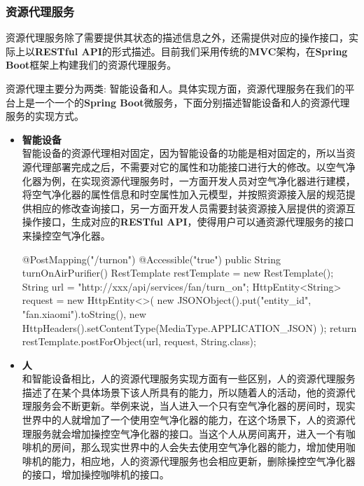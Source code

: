 \documentclass[a4paper, 12pt]{article}
\theoremstyle{definition}
\begin{document}
\subsubsection{资源代理服务}

资源代理服务除了需要提供其状态的描述信息之外，还需提供对应的操作接口，实际上以\textbf{RESTful API}的形式描述。目前我们采用传统的\textbf{MVC}架构，在\textbf{Spring Boot}框架上构建我们的资源代理服务。

资源代理主要分为两类: 智能设备和人。具体实现方面，资源代理服务在我们的平台上是一个一个的\textbf{Spring Boot}微服务，下面分别描述智能设备和人的资源代理服务的实现方式。

\begin{itemize}
	\item{\textbf{智能设备}}\\
	智能设备的资源代理相对固定，因为智能设备的功能是相对固定的，所以当资源代理部署完成之后，不需要对它的属性和功能接口进行大的修改。以空气净化器为例，在实现资源代理服务时，一方面开发人员对空气净化器进行建模，将空气净化器的属性信息和时空属性加入元模型，并按照资源接入层的规范提供相应的修改查询接口，另一方面开发人员需要封装资源接入层提供的资源互操作接口，生成对应的\textbf{RESTful API}，使得用户可以通资源代理服务的接口来操控空气净化器。
\begin{scala}
    @PostMapping("/turnon")
    @Accessible("true")
    public String turnOnAirPurifier(){
        RestTemplate restTemplate = new RestTemplate();
        String url = "http://xxx/api/services/fan/turn_on";
        HttpEntity<String> request = new HttpEntity<>(
            new JSONObject().put("entity_id", "fan.xiaomi").toString(), 
            new HttpHeaders().setContentType(MediaType.APPLICATION_JSON)
        );
        return restTemplate.postForObject(url, request, String.class);
    }
\end{scala}
    \item{\textbf{人}}\\
    和智能设备相比，人的资源代理服务实现方面有一些区别，人的资源代理服务描述了在某个具体场景下该人所具有的能力，所以随着人的活动，他的资源代理服务会不断更新。举例来说，当人进入一个只有空气净化器的房间时，现实世界中的人就增加了一个使用空气净化器的能力，在这个场景下，人的资源代理服务就会增加操控空气净化器的接口。当这个人从房间离开，进入一个有咖啡机的房间，那么现实世界中的人会失去使用空气净化器的能力，增加使用咖啡机的能力，相应地，人的资源代理服务也会相应更新，删除操控空气净化器的接口，增加操控咖啡机的接口。
\end{itemize}
\end{document}
